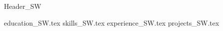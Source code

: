 {Header_SW}


\makecvheader
\vspace{10pt}

{education_SW.tex}
\vspace{4pt}
{skills_SW.tex}
\vspace{4pt}
{experience_SW.tex}
\vspace{4pt}
{projects_SW.tex}


